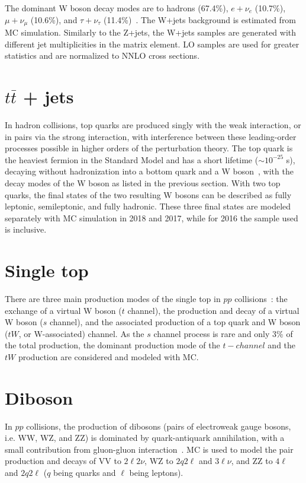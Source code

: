 The dominant W boson decay modes are to hadrons (67.4\%), $e + \nu_e$ (10.7\%), $\mu + \nu_\mu$ (10.6\%), and $\tau + \nu_\tau$ (11.4\%)~\cite{workman_review_2022}.
The W+jets background is estimated from MC simulation. Similarly to the Z+jets, the W+jets samples are generated with different jet multiplicities in the matrix element. LO samples are used for greater statistics and are normalized to NNLO cross sections. 

\section{\texorpdfstring{$t\bar{t}$}{ttbar} + jets}
In hadron collisions, top quarks are produced singly with the weak interaction, or in pairs via the strong interaction, with interference between these leading-order processes possible in higher orders of the perturbation theory. 
The top quark is the heaviest fermion in the Standard Model and has a short lifetime ($\sim 10^{-25}$ s), decaying without hadronization into a bottom quark and a W boson~\cite{workman_review_2022}, with the decay modes of the W boson as listed in the previous section. With two top quarks, the final states of the two resulting W bosons can be described as fully leptonic, semileptonic, and fully hadronic. These three final states are modeled separately with MC simulation in 2018 and 2017, while for 2016 the sample used is inclusive.

\section{Single top}
There are three main production modes of the single top in $pp$ collisions~\cite{CMS-CR-2018-185}: the exchange of a virtual W boson ($t$ channel), the production and decay of a virtual W boson ($s$ channel), and the associated production of a top quark and W boson ($tW$, or W-associated) channel. As the $s$ channel process is rare and only 3\% of the total production, the dominant production mode of the $t-channel$ and the $tW$ production are considered and modeled with MC. 

\section{Diboson}

In $pp$ collisions, the production of dibosons (pairs of electroweak gauge bosons, i.e. WW, WZ, and ZZ) is dominated by quark-antiquark annihilation, with a small contribution from gluon-gluon interaction~\cite{CMS-SMP-20-012}. MC is used to model the pair production and decays of VV to $2\ell 2\nu$, WZ to $2q 2\ell$ and $3 \ell \nu$, and ZZ to $4\ell$ and $2q 2\ell$ ($q$ being quarks and $\ell$ being leptons).

